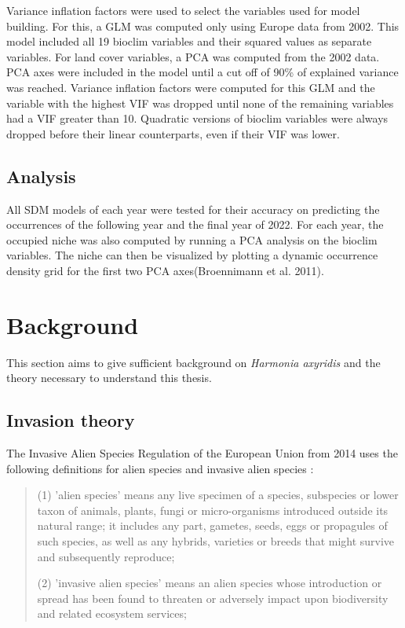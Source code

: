 \documentclass[12pt,a4paper]{article}
\begin{document}
Variance inflation factors were used to select the variables used for model building. 
For this, a GLM was computed only using Europe data from 2002.
This model included all 19 bioclim variables and their squared values as separate variables.
For land cover variables, a PCA was computed from the 2002 data.
PCA axes were included in the model until a cut off of 90\% of explained variance was reached.
Variance inflation factors were computed for this GLM and the variable with the highest VIF was dropped until none of the remaining variables had a VIF greater than 10. Quadratic versions of bioclim variables were always dropped before their linear counterparts, even if their VIF was lower.

\subsection{Analysis}
All SDM models of each year were tested for their accuracy on predicting the occurrences of the following year and the final year of 2022. 
For each year, the occupied niche was also computed by running a PCA analysis on the bioclim variables. The niche can then be visualized by plotting a dynamic occurrence density grid for the first two PCA axes(Broennimann et al. 2011).



\newpage
\section{Background}
This section aims to give sufficient background on \textit{Harmonia axyridis} and the theory necessary to understand this thesis.

\subsection{Invasion theory}
The Invasive Alien Species Regulation of the European Union from 2014 uses the following definitions for alien species and invasive alien species \cite{EU2014LexIAS}:
\begin{quote}
    (1) 'alien species' means any live specimen of a species, subspecies or lower taxon of animals, plants, fungi or micro-organisms introduced outside its natural range; it includes any part, gametes, seeds, eggs or propagules of such species, as well as any hybrids, varieties or breeds that might survive and subsequently reproduce;

    (2) 'invasive alien species' means an alien species whose introduction or spread has been found to threaten or adversely impact upon biodiversity and related ecosystem services;
\end{quote}
\end{document}
